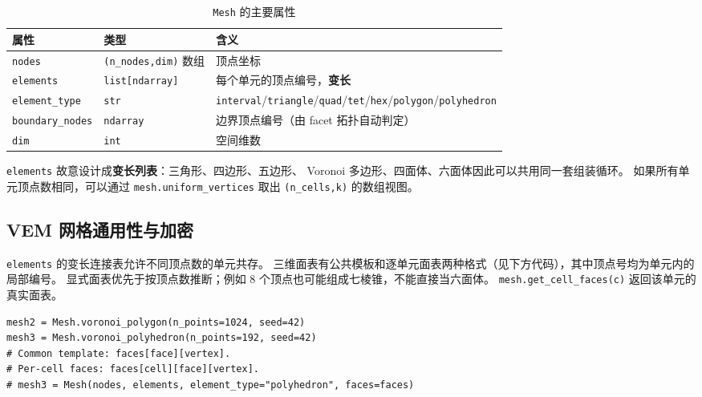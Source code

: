 \documentclass[UTF8,11pt,oneside]{ctexbook}
\theoremstyle{definition}
\theoremstyle{plain}
\newenvironment{important}{%
  \begin{tcolorbox}[colback=blue!5,colframe=blue!45,title=要点,fonttitle=\bfseries]%
}{%
  \end{tcolorbox}%
}
\newcommand{\code}[1]{\texttt{#1}}
\begin{document}
\begin{table}[htbp]
\centering
\caption{\code{Mesh} 的主要属性}
\label{tab:mesh-attrs}
\begin{lrbox}{\guideTableBox}
\begin{tabular}{@{}L{2.8cm}L{1.9cm}L{9.9cm}@{}}
\toprule
属性 & 类型 & 含义 \\
\midrule
\code{nodes} & \code{(n\_\allowbreak nodes,\allowbreak  dim)} 数组 & 顶点坐标 \\
\code{elements} & \code{list[}\allowbreak\code{ndarray]} & 每个单元的顶点编号，\textbf{变长} \\
\code{element\_\allowbreak type} & \code{str} & \code{interval}/\allowbreak\code{triangle}/\allowbreak\code{quad}/\allowbreak\code{tet}/\allowbreak\code{hex}/\allowbreak\code{polygon}/\allowbreak\code{polyhedron} \\
\code{boundary\_\allowbreak nodes} & \code{ndarray} & 边界顶点编号（由 facet 拓扑自动判定） \\
\code{dim} & \code{int} & 空间维数 \\
\bottomrule
\end{tabular}
\end{lrbox}%
\ifdim\wd\guideTableBox>\linewidth
  \resizebox{\linewidth}{!}{\usebox{\guideTableBox}}%
\else\usebox{\guideTableBox}\fi
\end{table}

\begin{important}
\code{elements} 故意设计成\textbf{变长列表}：三角形、四边形、五边形、
Voronoi 多边形、四面体、六面体因此可以共用同一套组装循环。
如果所有单元顶点数相同，可以通过 \code{mesh.uniform\_\allowbreak vertices}
取出 \code{(n\_\allowbreak cells,\allowbreak  k)} 的数组视图。
\end{important}

\subsection{VEM 网格通用性与加密}
\label{sec:vem-mesh-general}
\code{elements} 的变长连接表允许不同顶点数的单元共存。
三维面表有公共模板和逐单元面表两种格式（见下方代码），其中顶点号均为单元内的局部编号。
显式面表优先于按顶点数推断；例如 8 个顶点也可能组成七棱锥，不能直接当六面体。
\code{mesh.get\_\allowbreak cell\_\allowbreak faces(c)} 返回该单元的真实面表。

\begin{lstlisting}[language=MosicaFE,caption={二维与三维多边形网格入口}]
mesh2 = Mesh.voronoi_polygon(n_points=1024, seed=42)
mesh3 = Mesh.voronoi_polyhedron(n_points=192, seed=42)
# Common template: faces[face][vertex].
# Per-cell faces: faces[cell][face][vertex].
# mesh3 = Mesh(nodes, elements, element_type="polyhedron", faces=faces)
\end{lstlisting}
\end{document}
